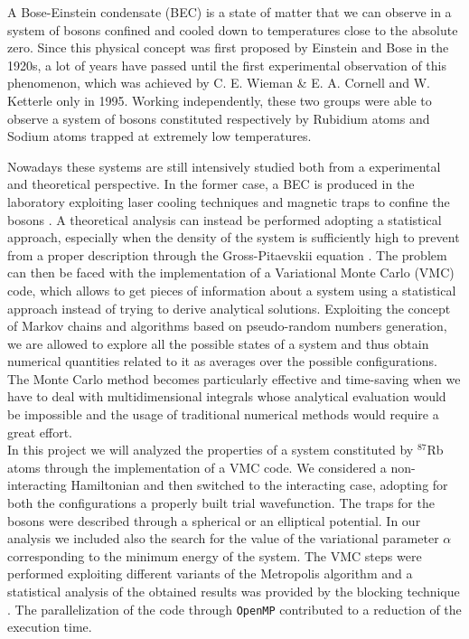 A Bose-Einstein condensate (BEC) is a state of matter that we can observe in a system of bosons confined and cooled down to temperatures close to the absolute zero. Since this physical concept was first proposed by Einstein and Bose \cite{einstein_original} in the 1920s, a lot of years have passed until the first experimental observation of this phenomenon, which was achieved by C. E. Wieman \& E. A. Cornell \cite{wieman} and W. Ketterle \cite{ketterle} only in 1995. Working independently, these two groups were able to observe a system of bosons constituted respectively by Rubidium atoms and Sodium atoms trapped at extremely low temperatures. 

Nowadays these systems are still intensively studied both from a experimental and theoretical perspective. In the former case, a BEC is produced in the laboratory exploiting laser cooling techniques and magnetic traps to confine the bosons \cite{lasercooling}. A theoretical analysis can instead be performed adopting a statistical approach, especially when the density of the system is sufficiently high to prevent from a proper description through the Gross-Pitaevskii equation \cite{gross}\cite{pita}. The problem can then be faced with the implementation of a Variational Monte Carlo (VMC) code, which allows to get pieces of information about a system using a statistical approach instead of trying to derive analytical solutions. Exploiting the concept of Markov chains \cite{markov} and algorithms based on pseudo-random numbers generation, we are allowed to explore all the possible states of a system and thus obtain numerical quantities related to it as averages over the possible configurations. The Monte Carlo method becomes particularly effective and time-saving when we have to deal with multidimensional integrals whose analytical evaluation would be impossible and the usage of traditional numerical methods would require a great effort. \\


In this project we will analyzed the properties of a system constituted by $^{87}$Rb atoms through the implementation of a VMC code. We considered a non-interacting Hamiltonian and then switched to the interacting case, adopting for both the configurations a properly built trial wavefunction. The traps for the bosons were described through a spherical or an elliptical potential. In our analysis we included also the search for the value of the variational parameter $\alpha$ corresponding to the minimum energy of the system. The VMC steps were performed exploiting different variants of the Metropolis algorithm \cite{metropolis} \cite{hastings} and a statistical analysis of the obtained results was provided by the blocking technique \cite{Marius}. The parallelization of the code through \texttt{OpenMP} contributed to a reduction of the execution time.


